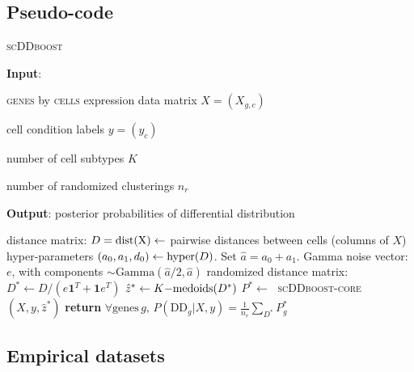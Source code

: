 \documentclass[aoas,preprint]{imsart}
\begin{document}
\newpage
\subsection*{Pseudo-code}

\begin{algorithm}
\caption{\textsc{scDDboost}}\label{alg:scDDboost}
\raggedright\hspace*{\algorithmicindent} \textbf{Input}: \begin{list}{}{}
 \item  \textsc{genes} by \textsc{cells} expression data matrix $X=(X_{g,c})$
 \item  cell condition labels $y=(y_c)$
 \item  number of cell subtypes $K$
 \item number of randomized clusterings $n_r$
 \end{list}
\hspace*{\algorithmicindent} \textbf{Output}: posterior probabilities of differential distribution
\begin{algorithmic}[2]
\State distance matrix: $D=\rm{dist}(X) \gets$ pairwise distances between cells (columns of $X$)
\State hyper-parameters $(a_0, a_1, d_0) \gets {\mbox {\rm hyper}}(D)$. Set $\hat a = a_0 + a_1$.
\Repeat
\State Gamma noise vector: $e$, with components $\sim \text{Gamma}(\hat a/2,\hat a)$
\State randomized distance matrix: $D^* \gets D / (e\textbf{1}^T +  \textbf{1}e^T)$
\State $\hat z^* \gets {\mbox {\rm $K-$medoids}}(D^*)$
\State $P^* \gets\;$ \textsc{scDDboost-core}$(X,y,\hat z^*)$
\State \textbf{return} $\forall \text{genes} \, g, \, P(\text{DD}_g|X,y) = \frac{1}{n_r}
   \sum_{D^*} P^*_g$
\EndProcedure
\end{algorithmic}
\end{algorithm}
\FloatBarrier


\subsection*{Empirical datasets}
\end{document}
